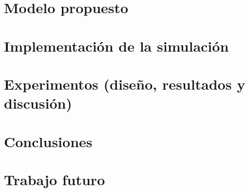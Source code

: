 \documentclass{article}
\begin{document}
\begin{multicols}{2}
\section{Modelo propuesto}


\section{Implementación de la simulación}


\section{Experimentos (diseño, resultados y discusión)}

\section{Conclusiones}

\section{Trabajo futuro}



\end{multicols}
\end{document}
